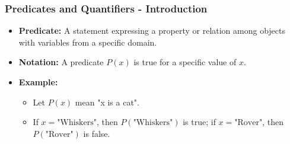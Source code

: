 \documentclass[aspectratio=169]{beamer}
\begin{document}
\begin{frame}[fragile]
    \frametitle{Predicates and Quantifiers - Introduction}
    \begin{itemize}
        \item \textbf{Predicate:} A statement expressing a property or relation among objects with variables from a specific domain.
        \item \textbf{Notation:} A predicate \( P(x) \) is true for a specific value of \( x \).
        \item \textbf{Example:} 
          \begin{itemize}
              \item Let \( P(x) \) mean "x is a cat".
              \item If \( x = \text{"Whiskers"} \), then \( P(\text{"Whiskers"}) \) is true; if \( x = \text{"Rover"} \), then \( P(\text{"Rover"}) \) is false.
          \end{itemize}
    \end{itemize}
\end{frame}
\end{document}
